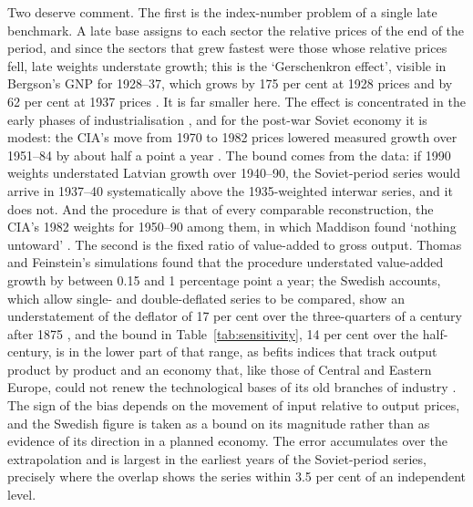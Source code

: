 Two deserve comment. The first is the index-number problem of a single late benchmark. A late base assigns to each sector the relative prices of the end of the period, and since the sectors that grew fastest were those whose relative prices fell, late weights understate growth; this is the `Gerschenkron effect', visible in Bergson's GNP for 1928--37, which grows by 175 per cent at 1928 prices and by 62 per cent at 1937 prices \parencite[517]{feinsteinthomas2002}. It is far smaller here. The effect is concentrated in the early phases of industrialisation \parencite[85]{jonassardy1970}, and for the post-war Soviet economy it is modest: the CIA's move from 1970 to 1982 prices lowered measured growth over 1951--84 by about half a point a year \parencites[6--7]{cia1990}[156]{harrison1993}. The bound comes from the data: if 1990 weights understated Latvian growth over 1940--90, the Soviet-period series would arrive in 1937--40 systematically above the 1935-weighted interwar series, and it does not. And the procedure is that of every comparable reconstruction, the CIA's 1982 weights for 1950--90 among them, in which Maddison found `nothing untoward' \parencite[312]{Maddison1998b}. The second is the fixed ratio of value-added to gross output. Thomas and Feinstein's simulations found that the procedure understated value-added growth by between 0.15 and 1 percentage point a year; the Swedish accounts, which allow single- and double-deflated series to be compared, show an understatement of the deflator of 17 per cent over the three-quarters of a century after 1875 \parencites[19]{swedengdp_15602010}[148--53]{lobellschonkrantz2008}, and the bound in Table~\ref{tab:sensitivity}, 14 per cent over the half-century, is in the lower part of that range, as befits indices that track output product by product and an economy that, like those of Central and Eastern Europe, could not renew the technological bases of its old branches of industry \parencite[195--7]{berend_centraleastern19441993}. The sign of the bias depends on the movement of input relative to output prices, and the Swedish figure is taken as a bound on its magnitude rather than as evidence of its direction in a planned economy. The error accumulates over the extrapolation and is largest in the earliest years of the Soviet-period series, precisely where the overlap shows the series within 3.5 per cent of an independent level.

